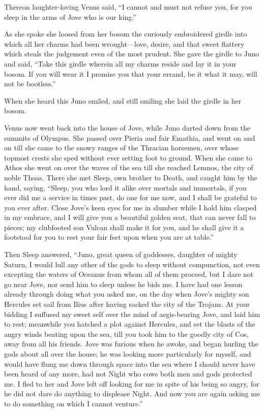 Thereon laughter-loving Venus said, “I cannot and must not refuse you, for
you sleep in the arms of Jove who is our king.”

As she spoke she loosed from her bosom the curiously embroidered girdle
into which all her charms had been wrought—love, desire, and that
sweet flattery which steals the judgement even of the most prudent. She
gave the girdle to Juno and said, “Take this girdle wherein all my charms
reside and lay it in your bosom. If you will wear it I promise you that
your errand, be it what it may, will not be bootless.”

When she heard this Juno smiled, and still smiling she laid the girdle in
her bosom.

Venus now went back into the house of Jove, while Juno darted down from
the summits of Olympus. She passed over Pieria and fair Emathia, and went
on and on till she came to the snowy ranges of the Thracian horsemen, over
whose topmost crests she sped without ever setting foot to ground. When
she came to Athos she went on over the waves of the sea till she reached
Lemnos, the city of noble Thoas. There she met Sleep, own brother to
Death, and caught him by the hand, saying, “Sleep, you who lord it alike
over mortals and immortals, if you ever did me a service in times past, do
one for me now, and I shall be grateful to you ever after. Close Jove’s
keen eyes for me in slumber while I hold him clasped in my embrace, and I
will give you a beautiful golden seat, that can never fall to pieces; my
clubfooted son Vulcan shall make it for you, and he shall give it a
footstool for you to rest your fair feet upon when you are at table.”

Then Sleep answered, “Juno, great queen of goddesses, daughter of mighty
Saturn, I would lull any other of the gods to sleep without compunction,
not even excepting the waters of Oceanus from whom all of them proceed,
but I dare not go near Jove, nor send him to sleep unless he bids me. I
have had one lesson already through doing what you asked me, on the day
when Jove’s mighty son Hercules set sail from Ilius after having sacked
the city of the Trojans. At your bidding I suffused my sweet self over the
mind of aegis-bearing Jove, and laid him to rest; meanwhile you hatched a
plot against Hercules, and set the blasts of the angry winds beating upon
the sea, till you took him to the goodly city of Cos, away from all his
friends. Jove was furious when he awoke, and began hurling the gods about
all over the house; he was looking more particularly for myself, and would
have flung me down through space into the sea where I should never have
been heard of any more, had not Night who cows both men and gods protected
me. I fled to her and Jove left off looking for me in spite of his being
so angry, for he did not dare do anything to displease Night. And now you
are again asking me to do something on which I cannot venture.”

